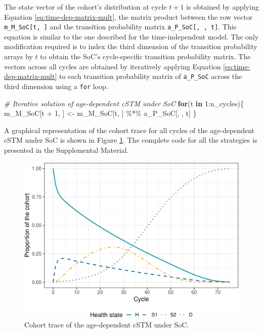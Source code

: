\documentclass[
]{article}
\newenvironment{Shaded}{\begin{snugshade}}{\end{snugshade}}
\newcommand{\CommentTok}[1]{\textcolor[rgb]{0.56,0.35,0.01}{\textit{#1}}}
\newcommand{\ControlFlowTok}[1]{\textcolor[rgb]{0.13,0.29,0.53}{\textbf{#1}}}
\newcommand{\DecValTok}[1]{\textcolor[rgb]{0.00,0.00,0.81}{#1}}
\newcommand{\NormalTok}[1]{#1}
\newcommand{\OtherTok}[1]{\textcolor[rgb]{0.56,0.35,0.01}{#1}}
\newcommand{\SpecialCharTok}[1]{\textcolor[rgb]{0.00,0.00,0.00}{#1}}
\begin{document}
The state vector of the cohort's distribution at cycle \(t+1\) is obtained by applying Equation \eqref{eq:time-dep-matrix-mult}, the matrix product between the row vector \texttt{m\_M\_SoC{[}t,\ {]}} and the transition probability matrix \texttt{a\_P\_SoC{[},\ ,\ t{]}}. This equation is similar to the one described for the time-independent model. The only modification required is to index the third dimension of the transition probability arrays by \(t\) to obtain the SoC's cycle-specific transition probability matrix. The vectors across all cycles are obtained by iteratively applying Equation \eqref{eq:time-dep-matrix-mult} to each transition probability matrix of \texttt{a\_P\_SoC} across the third dimension using a \texttt{for} loop.

\begin{Shaded}
\begin{Highlighting}[]
\CommentTok{\# Iterative solution of age{-}dependent cSTM under SoC}
\ControlFlowTok{for}\NormalTok{(t }\ControlFlowTok{in} \DecValTok{1}\SpecialCharTok{:}\NormalTok{n\_cycles)\{}
\NormalTok{  m\_M\_SoC[t }\SpecialCharTok{+} \DecValTok{1}\NormalTok{, ] }\OtherTok{\textless{}{-}}\NormalTok{ m\_M\_SoC[t, ] }\SpecialCharTok{\%*\%}\NormalTok{ a\_P\_SoC[, , t]}
\NormalTok{\}}
\end{Highlighting}
\end{Shaded}

A graphical representation of the cohort trace for all cycles of the age-dependent cSTM under SoC is shown in Figure \ref{fig:Sick-Sicker-Trace-AgeDep}. The complete code for all the strategies is presented in the Supplemental Material.

\begin{figure}[H]

{\centering \includegraphics{figs/Sick-Sicker-Trace-AgeDep-1} 

}

\caption{Cohort trace of the age-dependent cSTM under SoC.}\label{fig:Sick-Sicker-Trace-AgeDep}
\end{figure}
\end{document}
